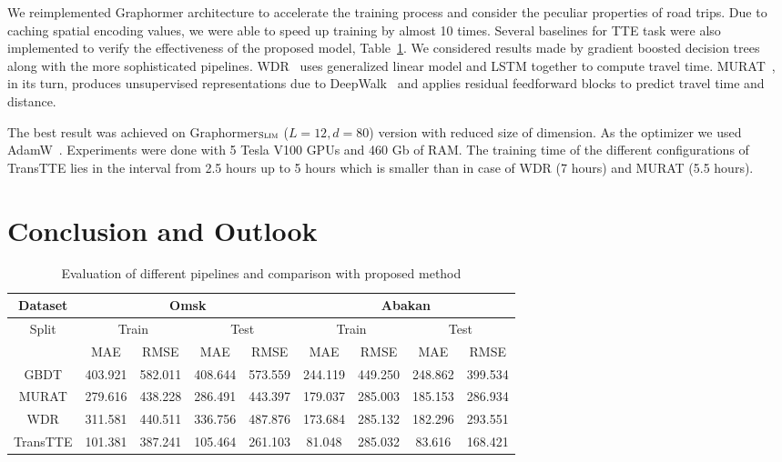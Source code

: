 \documentclass{svproc}
\begin{document}
We reimplemented Graphormer architecture to accelerate the training process and consider the peculiar properties of road trips. Due to caching spatial encoding values, we were able to speed up training by almost 10 times. Several baselines for TTE task were also implemented to verify the effectiveness of the proposed model, Table~\ref{tab:results}. We considered results made by gradient boosted decision trees along with the more sophisticated pipelines. WDR~\cite{wdr} uses generalized linear model and LSTM together to compute travel time. MURAT~\cite{murat}, in its turn, produces unsupervised representations due to DeepWalk~\cite{deepwalk} and applies residual feedforward blocks to predict travel time and distance. 

The best result was achieved on Graphormer$_{\small \textsc{Slim}}$ ($L=12, d=80$) version with reduced size of dimension.
As the optimizer we used AdamW~\cite{AdamW}. Experiments were done with 5 Tesla V100 GPUs and 460 Gb of RAM. The training time of the different  configurations of TransTTE lies in the interval from 2.5 hours up to 5 hours which is smaller than in case of WDR (7 hours) and MURAT (5.5 hours).

\section{Conclusion and Outlook}

\begin{table}[t] 
\centering
\begin{tabular}{c|c|cc|cc|cc|cc}
\toprule
\toprule
\multicolumn{2}{c|}{ Dataset } & \multicolumn{4}{c|}{Omsk} & \multicolumn{4}{c}{Abakan} \\
\midrule
\multicolumn{2}{c|}{Split} & \multicolumn{2}{c|}{Train} & \multicolumn{2}{c|}{Test} & \multicolumn{2}{c|}{Train} & \multicolumn{2}{c}{Test}\\
\midrule
\multicolumn{2}{c|}{} & MAE & RMSE & MAE & RMSE & MAE & RMSE & MAE & RMSE\\
\midrule
\multicolumn{2}{c|}{GBDT} & 403.921 & 582.011 & 408.644 & 573.559 & 244.119 & 449.250 & 248.862 & 399.534\\
\multicolumn{2}{c|}{MURAT} & 279.616 & 438.228 & 286.491 & 443.397 & 179.037 & 285.003 & 185.153 & 286.934 \\
\multicolumn{2}{c|}{WDR} & 311.581 & 440.511 & 336.756 & 487.876 & 173.684 & 285.132 & 182.296 & 293.551 \\
\midrule
\multicolumn{2}{c|}{TransTTE} & 101.381 & 387.241 & 105.464 & 261.103 & 81.048 & 285.032 & 83.616 & 168.421\\
\bottomrule
\bottomrule
\end{tabular}
\caption{Evaluation of different pipelines and comparison with proposed method}
\label{tab:results}
\end{table}
\end{document}
